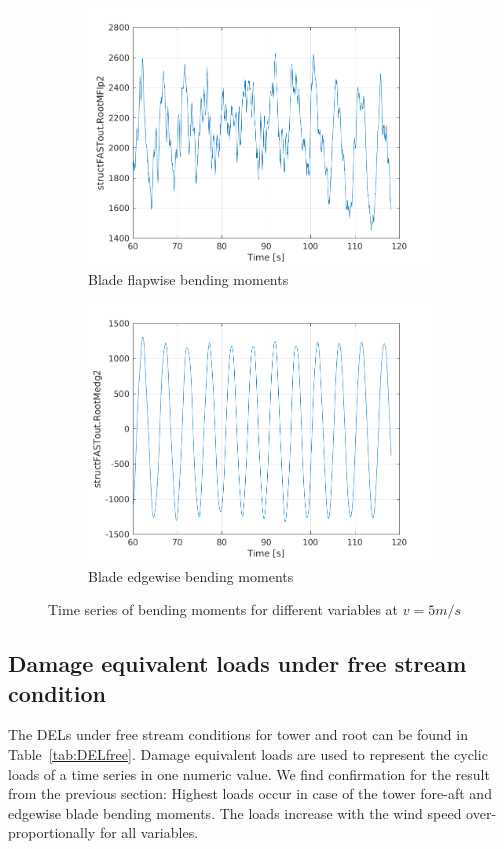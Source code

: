 \documentclass[10pt]{article}
\begin{document}
\begin{figure}[H]
\begin{subfigure}{0.40\textwidth}
  \includegraphics[width=1\linewidth]{../CIP_6/FAST/Plots_ws5/RootMFlp2.png}
\caption{Blade flapwise bending moments}
\end{subfigure}
\begin{subfigure}{0.40\textwidth}
  \includegraphics[width=1\linewidth]{../CIP_6/FAST/Plots_ws5/RootMedg2.png}
\caption{Blade edgewise bending moments}
\end{subfigure}
\caption{Time series of bending moments for different variables at $v=5m/s$}
\label{fig:bendingmoments5ms}
\end{figure}

\subsection{Damage equivalent loads under free stream condition}
The DELs under free stream conditions for tower and root can be found in Table~\ref{tab:DELfree}. Damage equivalent loads are used to represent the cyclic loads of a time series in one numeric value. We find confirmation for the result from the previous section: Highest loads occur in case of the tower fore-aft and edgewise blade bending moments. The loads increase with the wind speed over-proportionally for all variables. 
\end{document}
